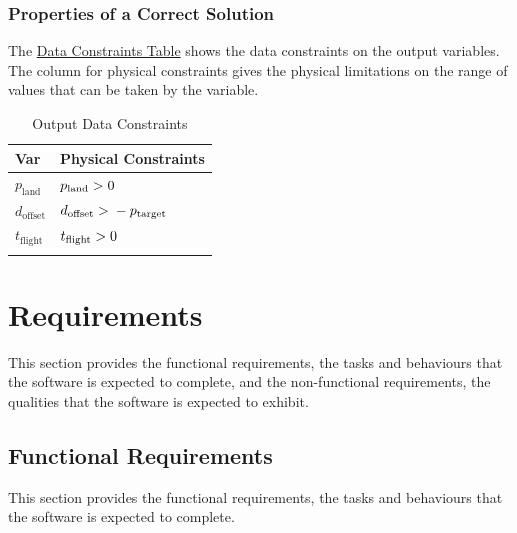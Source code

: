 \documentclass[12pt]{article}
\newcommand{\gt}{\ensuremath >}
\begin{document}
\subsubsection{Properties of a Correct Solution}
\label{Sec:CorSolProps}
The \hyperref[Table:OutDataConstraints]{Data Constraints Table} shows the data constraints on the output variables. The column for physical constraints gives the physical limitations on the range of values that can be taken by the variable.

\begin{longtable}{l l}
\toprule
\textbf{Var} & \textbf{Physical Constraints}
\\
\midrule
\endhead
${p_{\text{land}}}$ & ${p_{\text{land}}}\gt{}0$
\\
${d_{\text{offset}}}$ & ${d_{\text{offset}}}\gt{}-{p_{\text{target}}}$
\\
${t_{\text{flight}}}$ & ${t_{\text{flight}}}\gt{}0$
\\
\bottomrule
\caption{Output Data Constraints}
\label{Table:OutDataConstraints}
\end{longtable}
\section{Requirements}
\label{Sec:Requirements}
This section provides the functional requirements, the tasks and behaviours that the software is expected to complete, and the non-functional requirements, the qualities that the software is expected to exhibit.

\subsection{Functional Requirements}
\label{Sec:FRs}
This section provides the functional requirements, the tasks and behaviours that the software is expected to complete.
\end{document}
